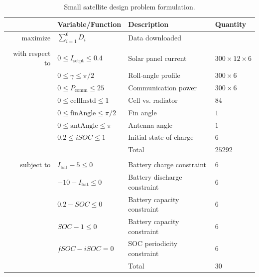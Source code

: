 \documentclass[]{aiaa-tc} %
\begin{document}
    \begin{table}
        \centering
        \caption{Small satellite design problem formulation.}
        \begin{tabular}{r l l l}
            \hline
            & Variable/Function & Description & Quantity \\
            \hline
            maximize            & $\sum_{i=1}^6 D_i$ & Data downloaded \\
            \\
            with respect to & $0 \le I_\text{setpt} \le 0.4$ & Solar panel current & $300 \times 12 \times 6$ \\
                                    & $0 \le \gamma \le \pi / 2$ & Roll-angle profile & $300 \times 6$ \\
                                    & $0 \le P_\text{comm} \le 25$ & Communication power & $300 \times 6$ \\
                                    & $0 \le \text{cellInstd} \le 1$ & Cell vs. radiator & $84$ \\
                                    & $0 \le \text{finAngle} \le \pi / 2$ & Fin angle & $1$ \\
                                    & $0 \le \text{antAngle} \le \pi$ & Antenna angle & $1$ \\
                                    & $0.2 \le iSOC \le 1$ & Initial state of charge & $6$ \\
                                    & & Total & $25292$ \\
            \\
            subject to          & $I_\text{bat} - 5 \le 0$ & Battery charge constraint & $6$ \\
                                    & $-10 - I_\text{bat} \le 0$ & Battery discharge constraint & $6$ \\
                                    & $0.2 - SOC \le 0$ & Battery capacity constraint & $6$ \\
                                    & $SOC - 1 \le 0$ & Battery capacity constraint & $6$ \\
                                    & $fSOC - iSOC = 0$ & SOC periodicity constraint & $6$ \\
                                    & & Total & $30$ \\
            \hline
        \end{tabular}
        
        \label{eqn:cadre_formulation}
    \end{table}
\end{document}
